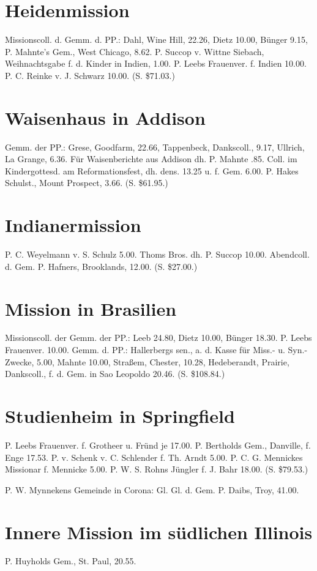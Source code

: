 \section{Heidenmission}
Missionscoll. d. Gemm. d. PP.: Dahl, Wine Hill, 22.26, Dietz 10.00, Bünger 9.15, P. Mahnte’s Gem., West Chicago, 8.62. P. Succop v. Wittne Siebach, Weihnachtsgabe f. d. Kinder in Indien, 1.00. P. Leebs Frauenver. f. Indien 10.00. P. C. Reinke v. J. Schwarz 10.00. (S. \$71.03.)

\section{Waisenhaus in Addison}
Gemm. der PP.: Grese, Goodfarm, 22.66, Tappenbeck, Dankscoll., 9.17, Ullrich, La Grange, 6.36. Für Waisenberichte aus Addison dh. P. Mahnte .85. Coll. im Kindergottesd. am Reformationsfest, dh. dens. 13.25 u. f. Gem. 6.00. P. Hakes Schulst., Mount Prospect, 3.66. (S. \$61.95.)

\section{Indianermission}
P. C. Weyelmann v. S. Schulz 5.00. Thoms Bros. dh. P. Succop 10.00. Abendcoll. d. Gem. P. Hafners, Brooklands, 12.00. (S. \$27.00.)

\section{Mission in Brasilien}
Missionscoll. der Gemm. der PP.: Leeb 24.80, Dietz 10.00, Bünger 18.30. P. Leebs Frauenver. 10.00. Gemm. d. PP.: Hallerbergs sen., a. d. Kasse für Miss.- u. Syn.-Zwecke, 5.00, Mahnte 10.00, Straßem, Chester, 10.28, Hedeberandt, Prairie, Dankscoll., f. d. Gem. in Sao Leopoldo 20.46. (S. \$108.84.)

\section{Studienheim in Springfield}
P. Leebs Frauenver. f. Grotheer u. Fründ je 17.00. P. Bertholds Gem., Danville, f. Enge 17.53. P. v. Schenk v. C. Schlender f. Th. Arndt 5.00. P. C. G. Mennickes Missionar f. Mennicke 5.00. P. W. S. Rohns Jüngler f. J. Bahr 18.00. (S. \$79.53.)

P. W. Mynnekens Gemeinde in Corona: Gl. Gl. d. Gem. P. Daibs, Troy, 41.00.


\section{Innere Mission im südlichen Illinois}
P. Huyholds Gem., St. Paul, 20.55.

